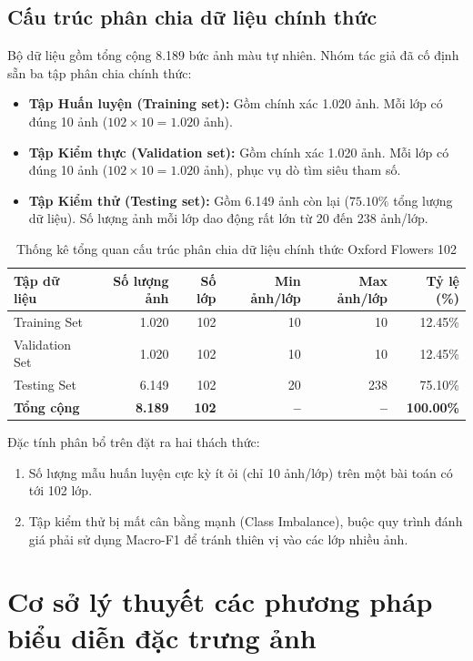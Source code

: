 \documentclass[../DoAn.tex]{subfiles}
\begin{document}
\subsection{Cấu trúc phân chia dữ liệu chính thức}
Bộ dữ liệu gồm tổng cộng 8.189 bức ảnh màu tự nhiên. Nhóm tác giả đã cố định sẵn ba tập phân chia chính thức:
\begin{itemize}
    \item \textbf{Tập Huấn luyện (Training set):} Gồm chính xác 1.020 ảnh. Mỗi lớp có đúng 10 ảnh ($102 \times 10 = 1.020$ ảnh).
    \item \textbf{Tập Kiểm thực (Validation set):} Gồm chính xác 1.020 ảnh. Mỗi lớp có đúng 10 ảnh ($102 \times 10 = 1.020$ ảnh), phục vụ dò tìm siêu tham số.
    \item \textbf{Tập Kiểm thử (Testing set):} Gồm 6.149 ảnh còn lại ($75.10\%$ tổng lượng dữ liệu). Số lượng ảnh mỗi lớp dao động rất lớn từ 20 đến 238 ảnh/lớp.
\end{itemize}

\begin{table}[H]
\centering
\small
\caption{Thống kê tổng quan cấu trúc phân chia dữ liệu chính thức Oxford Flowers 102}
\label{tab:dataset_summary}
\begin{tabular}{@{}lrrrrr@{}}
\hline
\textbf{Tập dữ liệu} & \textbf{Số lượng ảnh} & \textbf{Số lớp} & \textbf{Min ảnh/lớp} & \textbf{Max ảnh/lớp} & \textbf{Tỷ lệ (\%)} \\ \hline
Training Set & 1.020 & 102 & 10 & 10 & 12.45\% \\
Validation Set & 1.020 & 102 & 10 & 10 & 12.45\% \\
Testing Set & 6.149 & 102 & 20 & 238 & 75.10\% \\ \hline
\textbf{Tổng cộng} & \textbf{8.189} & \textbf{102} & \textbf{--} & \textbf{--} & \textbf{100.00\%} \\ \hline
\end{tabular}
\end{table}

Đặc tính phân bổ trên đặt ra hai thách thức:
\begin{enumerate}
    \item Số lượng mẫu huấn luyện cực kỳ ít ỏi (chỉ 10 ảnh/lớp) trên một bài toán có tới 102 lớp.
    \item Tập kiểm thử bị mất cân bằng mạnh (Class Imbalance), buộc quy trình đánh giá phải sử dụng Macro-F1 để tránh thiên vị vào các lớp nhiều ảnh.
\end{enumerate}

\section{Cơ sở lý thuyết các phương pháp biểu diễn đặc trưng ảnh}
\end{document}
